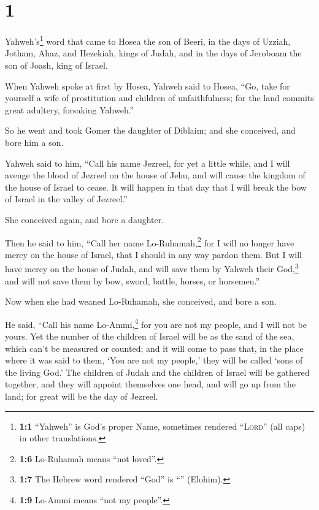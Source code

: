 \hypertarget{section}{%
\section{1}\label{section}}

 Yahweh's\footnote{\textbf{1:1} ``Yahweh'' is God's proper
  Name, sometimes rendered ``\textsc{Lord}'' (all caps) in other
  translations.} word that came to Hosea the son of Beeri, in the days
of Uzziah, Jotham, Ahaz, and Hezekiah, kings of Judah, and in the days
of Jeroboam the son of Joash, king of Israel.

 When Yahweh spoke at first by Hosea, Yahweh said to
Hosea, ``Go, take for yourself a wife of prostitution and children of
unfaithfulness; for the land commits great adultery, forsaking Yahweh.''

 So he went and took Gomer the daughter of Diblaim; and
she conceived, and bore him a son.

 Yahweh said to him, ``Call his name Jezreel, for yet a
little while, and I will avenge the blood of Jezreel on the house of
Jehu, and will cause the kingdom of the house of Israel to cease.
 It will happen in that day that I will break the bow of
Israel in the valley of Jezreel.''

 She conceived again, and bore a daughter.

Then he said to him, ``Call her name Lo-Ruhamah,\footnote{\textbf{1:6}
  Lo-Ruhamah means ``not loved''.} for I will no longer have mercy on
the house of Israel, that I should in any way pardon them.
 But I will have mercy on the house of Judah, and will
save them by Yahweh their God,\footnote{\textbf{1:7} The Hebrew word
  rendered ``God'' is ``'' (Elohim).} and will not save
them by bow, sword, battle, horses, or horsemen.''

 Now when she had weaned Lo-Ruhamah, she conceived, and
bore a son.

 He said, ``Call his name Lo-Ammi,\footnote{\textbf{1:9}
  Lo-Ammi means ``not my people''.} for you are not my people, and I
will not be yours.  Yet the number of the children of
Israel will be as the sand of the sea, which can't be measured or
counted; and it will come to pass that, in the place where it was said
to them, `You are not my people,' they will be called `sons of the
living God.'  The children of Judah and the children of
Israel will be gathered together, and they will appoint themselves one
head, and will go up from the land; for great will be the day of
Jezreel.


